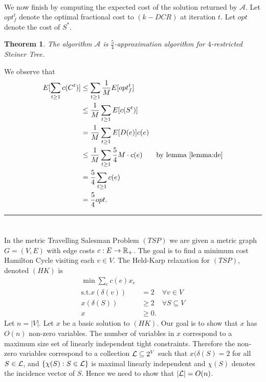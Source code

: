 \documentclass[letterpaper,12pt,oneside,onecolumn]{article}
\newcommand{\cA}{\mathcal{A}} \newcommand{\cB}{\mathcal{B}}
\newenvironment{proof}{{\bf Proof:  }}{\hfill\rule{2mm}{2mm}}
\newtheorem{theorem}[fact]{Theorem}
\begin{document}
\paragraph{}
We now finish by computing the expected cost of the solution returned by $\cA$. Let $opt^t_f$ denote the optimal fractional cost to $(k-DCR)$ at iteration $t$. Let $opt$ denote the cost of $S^*$.
\begin{theorem}
The algorithm $\cA$ is $\frac{5}{4}$-approximation algorithm for $4$-restricted Steiner Tree.
\end{theorem}
\begin{proof}
We observe that
\begin{align*}
E[\sum_{t\geq 1} c(C^t)] &\leq \sum_{t\geq 1} \frac{1}{M}E[opt^t_f] \\
&\leq \frac{1}{M} \sum_{t\geq 1} E[c(S^t)] \\
&=\frac{1}{M} \sum_{t\geq 1} E[D(e)]c(e) \\
&\leq \frac{1}{M} \sum_{t\geq 1} \frac{5}{4}M\cdot c(e) &\text{by lemma \ref{lemma:de}} \\
&=\frac{5}{4} \sum_{t \geq 1} c(e) \\
&= \frac{5}{4} opt.
\end{align*}
\end{proof}

\section{}
\paragraph{}
In the metric Travelling Salesman Problem $(TSP)$ we are given a metric graph $G=(V,E)$ with edge costs $c: E\rightarrow \mathbb{R}_+$. The goal is to find a minimum cost Hamilton Cycle visiting each $v \in V$. The Held-Karp relaxation for $(TSP)$, denoted $(HK)$ is
\begin{align*}
\min \sum_e c(e) x_e& \\
\text{s.t.} x(\delta(v)) &= 2 &\forall v \in V \\
x(\delta(S)) &\geq 2 &\forall S \subseteq V \\
x &\geq 0.
\end{align*}
Let $n = |V|$. Let $x$ be a basic solution to $(HK)$. Our goal is to show that $x$ has $O(n)$ non-zero variables. The number of variables in $x$ correspond to a maximum size set of linearly independent tight constraints. Therefore the non-zero variables correspond to a collection $\mathcal{L} \subseteq 2^V$ such that $x(\delta(S) = 2$ for all $S \in \mathcal{L}$, and $\{\chi(S): S \in \mathcal{L}\}$ is maximal linearly independent and $\chi(S)$ denotes the incidence vector of $S$. Hence we need to show that $|\mathcal{L}| = O(n)$.
\end{document}
